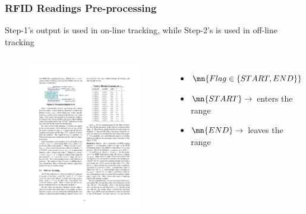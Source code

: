 
\begin{frame}
\frametitle{RFID Readings Pre-processing}

  \small{Step-1's output is used in on-line tracking, while Step-2's is used in off-line tracking}

  \begin{columns}[c]

    \begin{figure}[tb]
      \includegraphics[width=\columnwidth]{figures/2-1/2-1-8.pdf}
    \end{figure}

    \begin{itemize}
        \item $\mn{Flag \in \{ START, END \}}$
        \item $\mn{START} \rightarrow$ \textrm{enters the range}
        \item $\mn{END} \rightarrow$ \textrm{leaves the range}
    \end{itemize}

  \end{columns}

\end{frame}

